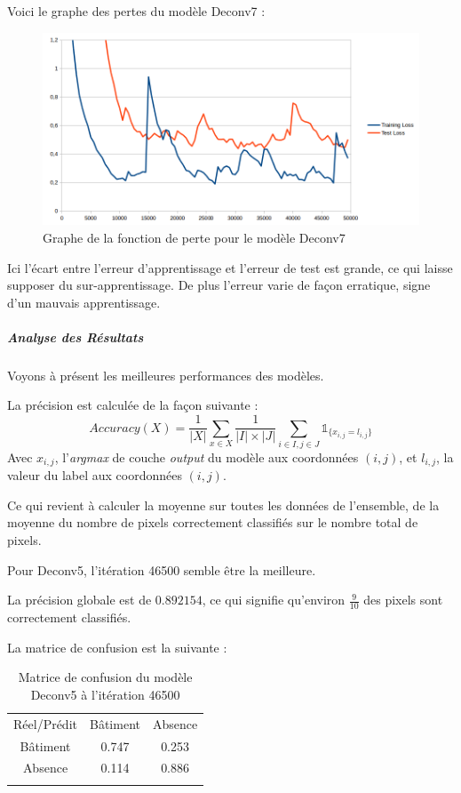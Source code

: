 \documentclass[a4paper, 11pt]{report}
\begin{document}
Voici le graphe des pertes du modèle Deconv7 :
\begin{figure}[H]
	\centering
	\includegraphics[scale=0.6]{Images/Losses_Deconv7.png}
	\caption{Graphe de la fonction de perte pour le modèle Deconv7}
\end{figure}
Ici l'écart entre l'erreur d'apprentissage et l'erreur de test est grande, ce qui laisse supposer du sur-apprentissage.
De plus l'erreur varie de façon erratique, signe d'un mauvais apprentissage.
\subparagraph{Analyse des Résultats}
Voyons à présent les meilleures performances des modèles.

La précision est calculée de la façon suivante :
$$Accuracy(X) = \frac{1}{|X|}\sum_{x \in X} {\frac{1}{|I| \times |J|}\sum_{i \in I, j \in J} {\mathds{1}_{\{x_{i, j} = l_{i, j}\}}}}$$
Avec $x_{i, j}$, l'\emph{argmax} de couche \emph{output} du modèle aux coordonnées $(i, j)$, et $l_{i,j}$, la valeur du label aux coordonnées $(i, j)$.

Ce qui revient à calculer la moyenne sur toutes les données de l'ensemble, de la moyenne du nombre de pixels correctement classifiés sur le nombre total de pixels.

Pour Deconv5, l'itération 46500 semble être la meilleure.

La précision globale est de $0.892154$, ce qui signifie qu'environ $\frac{9}{10}$ des pixels sont correctement classifiés.

La matrice de confusion est la suivante :
\begin{table}[H]
	\centering
	\begin{tabularx}{0.5\textwidth}{c|c c|}
		Réel/Prédit & Bâtiment & Absence \\
		\hhline{---}
		Bâtiment & 0.747 \cellcolor[gray]{.8} & 0.253 \\
		Absence & 0.114 & 0.886 \cellcolor[gray]{.8}\\
		\hhline{~--}
	\end{tabularx}
	\caption{Matrice de confusion du modèle Deconv5 à l'itération 46500}
\end{table}
\end{document}

